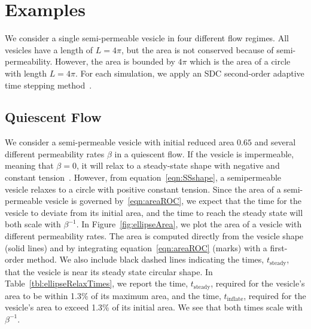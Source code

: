 \documentclass[aps,prl,showpacs]{revtex4}
\begin{document}


\section{Examples}
We consider a single semi-permeable vesicle in four different flow
regimes. All vesicles have a length of $L=4\pi$, but the area is not
conserved because of semi-permeability. However, the area is bounded by
$4\pi$ which is the area of a circle with length $L=4\pi$. For each
simulation, we apply an SDC second-order adaptive time stepping
method~\cite{qua-bir2016}. 



\subsection{Quiescent Flow} 
We consider a semi-permeable vesicle with initial reduced area $0.65$
and several different permeability rates $\beta$ in a quiescent flow. If
the vesicle is impermeable, meaning that $\beta = 0$, it will relax to a
steady-state shape with negative and constant
tension~\cite{kra-win-sei-lip1996}. However, from
equation~\eqref{eqn:SSshape}, a semipermeable vesicle relaxes to a
circle with positive constant tension. Since the area of a
semi-permeable vesicle is governed by~\eqref{eqn:areaROC}, we expect
that the time for the vesicle to deviate from its initial area, and the
time to reach the steady state will both scale with $\beta^{-1}$. In
Figure~\ref{fig:ellipseArea}, we plot the area of a vesicle with
different permeability rates. The area is computed directly from the
vesicle shape (solid lines) and by integrating
equation~\eqref{eqn:areaROC} (marks) with a first-order method. We also
include black dashed lines indicating the times, $t_{\mathrm{steady}}$,
that the vesicle is near its steady state circular shape. In
Table~\ref{tbl:ellipseRelaxTimes}, we report the time,
$t_\mathrm{steady}$, required for the vesicle's area to be within 1.3\%
of its maximum area, and the time, $t_\mathrm{inflate}$, required for
the vesicle's area to exceed 1.3\% of its initial area. We see that both
times scale with $\beta^{-1}$. 
\end{document}
